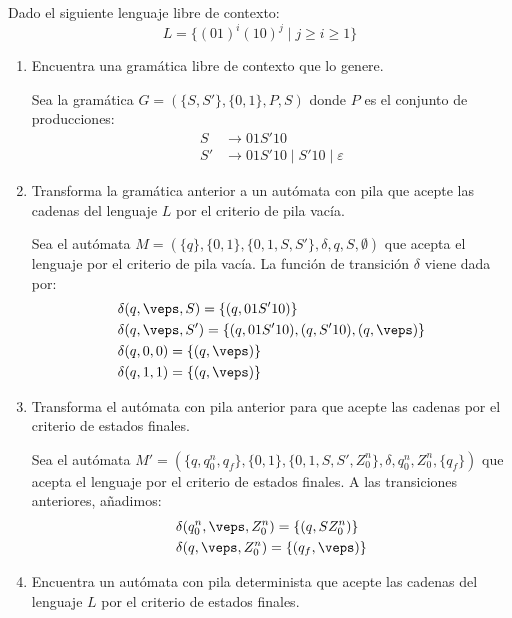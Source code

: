 \begin{ejercicio}\label{ej:1.5.28}
    Dado el siguiente lenguaje libre de contexto: $$L = \{{(01)}^{i}{(10)}^{j}\mid j\geq i \geq 1\}$$
    \begin{enumerate}
        \item Encuentra una gramática libre de contexto que lo genere.
        
        Sea la gramática $G = (\{S,S'\},\{0,1\},P,S)$ donde $P$ es el conjunto de producciones:
        \begin{align*}
            S & \rightarrow 01S'10\\
            S' & \rightarrow 01S'10 \mid S'10 \mid \varepsilon
        \end{align*}
        \item Transforma la gramática anterior a un autómata con pila que acepte las cadenas del lenguaje $L$ por el criterio de pila vacía.
        
        Sea el autómata $M = (\{q\},\{0,1\},\{0,1,S,S'\},\delta,q,S,\emptyset)$ que acepta el lenguaje por el criterio de pila vacía. La función de transición $\delta$ viene dada por:
        \begin{align*}
            &\delta(q,\veps, S) = \{(q,01S'10)\} \\
            &\delta(q,\veps, S') = \{(q,01S'10), (q,S'10), (q,\veps)\}\\
            &\delta(q,0,0) = \{(q,\veps)\} \\
            &\delta(q,1,1) = \{(q,\veps)\}
        \end{align*}
        \item Transforma el autómata con pila anterior para que acepte las cadenas por el criterio de estados finales.
        
        Sea el autómata $M' = (\{q, q_0^n, q_f\},\{0,1\},\{0,1,S,S', Z_0^n\},\delta,q_0^n,Z_0^n,\{q_f\})$ que acepta el lenguaje por el criterio de estados finales.
        A las transiciones anteriores, añadimos:
        \begin{align*}
            &\delta(q_0^n,\veps, Z_0^n) = \{(q,SZ_0^n)\} \\
            &\delta(q,\veps, Z_0^n) = \{(q_f,\veps)\}
        \end{align*}
        \item Encuentra un autómata con pila determinista que acepte las cadenas del lenguaje $L$ por el criterio de estados finales.
        

\end{enumerate}
\end{ejercicio}
